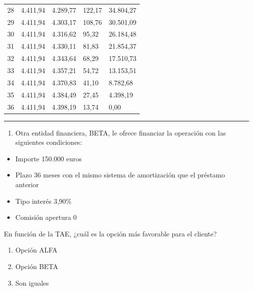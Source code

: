 \documentclass[
  letterpaper,
  DIV=11,
  numbers=noendperiod]{scrreprt}
\providecommand{\tightlist}{%
  \setlength{\itemsep}{0pt}\setlength{\parskip}{0pt}}\usepackage{longtable,booktabs,array}
\begin{document}
\begin{tcolorbox}
\begin{tcolorbox}
\begin{longtable}[]{@{}lllll@{}}
28 & 4.411,94 & 4.289,77 & 122,17 & 34.804,27 \\
29 & 4.411,94 & 4.303,17 & 108,76 & 30.501,09 \\
30 & 4.411,94 & 4.316,62 & 95,32 & 26.184,48 \\
31 & 4.411,94 & 4.330,11 & 81,83 & 21.854,37 \\
32 & 4.411,94 & 4.343,64 & 68,29 & 17.510,73 \\
33 & 4.411,94 & 4.357,21 & 54,72 & 13.153,51 \\
34 & 4.411,94 & 4.370,83 & 41,10 & 8.782,68 \\
35 & 4.411,94 & 4.384,49 & 27,45 & 4.398,19 \\
36 & 4.411,94 & 4.398,19 & 13,74 & 0,00 \\
\end{longtable}

\end{tcolorbox}

\begin{center}\rule{0.5\linewidth}{0.5pt}\end{center}

\begin{enumerate}
\def\labelenumi{\arabic{enumi}.}
\setcounter{enumi}{1}
\tightlist
\item
  Otra entidad financiera, BETA, le ofrece financiar la operación con
  las siguientes condiciones:
\end{enumerate}

\begin{itemize}
\item
  Importe 150.000 euros
\item
  Plazo 36 meses con el mismo sistema de amortización que el préstamo
  anterior
\item
  Tipo interés 3,90\%
\item
  Comisión apertura 0
\end{itemize}

En función de la TAE, ¿cuál es la opción más favorable para el cliente?

\begin{enumerate}
\def\labelenumi{\alph{enumi}.}
\item
  Opción ALFA
\item
  Opción BETA
\item
  Son iguales
\end{enumerate}

\begin{tcolorbox}[enhanced jigsaw, toprule=.15mm, left=2mm, breakable, opacitybacktitle=0.6, toptitle=1mm, coltitle=black, arc=.35mm, leftrule=.75mm, bottomtitle=1mm, titlerule=0mm, title=\textcolor{quarto-callout-tip-color}{\faLightbulb}\hspace{0.5em}{Solución}, rightrule=.15mm, opacityback=0, bottomrule=.15mm, colback=white, colframe=quarto-callout-tip-color-frame, colbacktitle=quarto-callout-tip-color!10!white]


\end{tcolorbox}
\end{tcolorbox}
\end{document}
